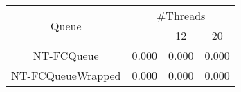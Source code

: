 \begin{tabular}{|c|c|c|c|}
\hline
\multirow{2}{*}{Queue} & \multicolumn{3}{c|}{\#Threads}\\\cline{2-4}& \quad 4 & 12 & 20\\
\hline
\hline
NT-FCQueue & 0.000 & 0.000 & 0.000\\
NT-FCQueueWrapped & 0.000 & 0.000 & 0.000\\
\hline\end{tabular}
